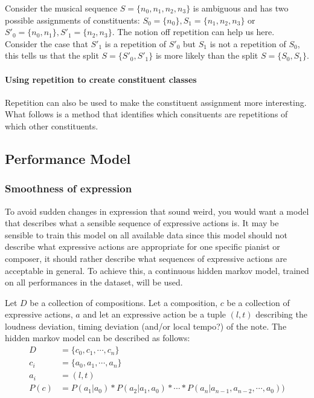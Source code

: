 \documentclass[a4paper,10pt]{article}
\begin{document}
Consider the musical sequence $S = \{n_0, n_1, n_2, n_3\}$ is ambiguous and has two possible assignments of constituents: $S_0 = \{n_0\}, S_1 = \{n_1, n_2, n_3\}$ or $S'_0 = \{n_0, n_1\}, S'_1 = \{n_2, n_3\}$. The notion off repetition can help us here. Consider the case that $S'_1$ is a repetition of $S'_0$ but $S_1$ is not a repetition of $S_0$, this tells us that the split $S = \{S'_0, S'_1\}$ is more likely than the split $S = \{S_0, S_1\}$.

\paragraph*{Using repetition to create constituent classes}

Repetition can also be used to make the constituent assignment more interesting. What follows is a method that identifies which consituents are repetitions of which other constituents.




\subsection{Performance Model}
\subsubsection{Smoothness of expression}
To avoid sudden changes in expression that sound weird, you would want a model that describes what a sensible sequence of expressive actions is. It may be sensible to train this model on all available data since this model should not describe what expressive actions are appropriate for one specific pianist or composer, it should rather describe what sequences of expressive actions are acceptable in general. To achieve this, a continuous hidden markov model, trained on all performances in the dataset, will be used.

Let $D$ be a collection of compositions. Let a composition, $c$ be a collection of expressive actions, $a$ and let an expressive action be a tuple $(l,t)$ describing the loudness deviation, timing deviation (and/or local tempo?) of the note. The hidden markov model can be described as follows:
\begin{align*}
D &= \{c_0, c_1, \cdots, c_n\}\\
c_i &= \{a_0, a_1, \cdots, a_n\}\\
a_i &= (l,t)\\
P(c) &= P(a_1 | a_0) * P(a_2|a_1, a_0) * \cdots * P(a_n|a_{n-1}, a_{n-2}, \cdots, a_0))
\end{align*}
\end{document}
